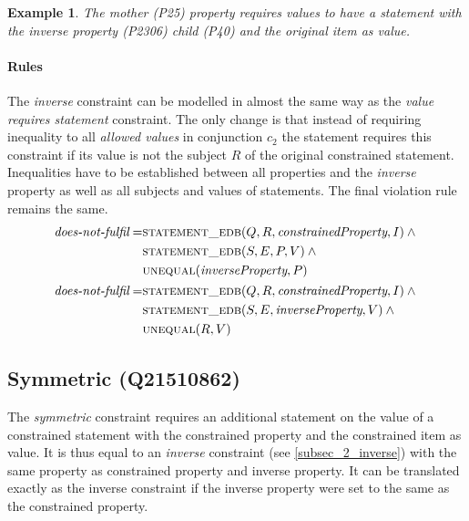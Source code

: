 \documentclass[hyperref,bachelorofscience,fleqn]{cgvpub}
\newtheorem{example}{Example}
\begin{document}
\begin{example}
The \emph{mother} (P25) property requires values to have a statement with the \emph{inverse property} (P2306) \emph{child} (P40) and the original item as value.
\end{example}

\paragraph{Rules}
The \emph{inverse} constraint can be modelled in almost the same way as the \emph{value requires statement} constraint. The only change is that instead of requiring inequality to all \emph{allowed values} in conjunction \(c_2\) the statement requires this constraint if its value is not the subject \(R\) of the original constrained statement. Inequalities have to be established between all properties and the \emph{inverse} property as well as all subjects and values of statements. The final violation rule remains the same.
\begin{align}
\begin{split}
\emph{does-not-fulfil} = &\textsc{statement\_edb}(Q, R, \emph{constrainedProperty}, I) \wedge{} \\
&\textsc{statement\_edb}(S, E, P, V) \wedge{} \\
&\textsc{unequal}(\emph{inverseProperty}, P)
\end{split}\\
\begin{split}
\emph{does-not-fulfil} = &\textsc{statement\_edb}(Q, R, \emph{constrainedProperty}, I) \wedge{} \\
&\textsc{statement\_edb}(S, E, \emph{inverseProperty}, V) \wedge{} \\
&\textsc{unequal}(R, V)
\end{split}
\end{align}


\subsection{Symmetric (Q21510862)}
The \emph{symmetric} constraint requires an additional statement on the value of a constrained statement with the constrained property and the constrained item as value. It is thus equal to an \emph{inverse} constraint (see \ref{subsec_2_inverse}) with the same property as constrained property and inverse property. It can be translated exactly as the inverse constraint if the inverse property were set to the same as the constrained property.
\end{document}
